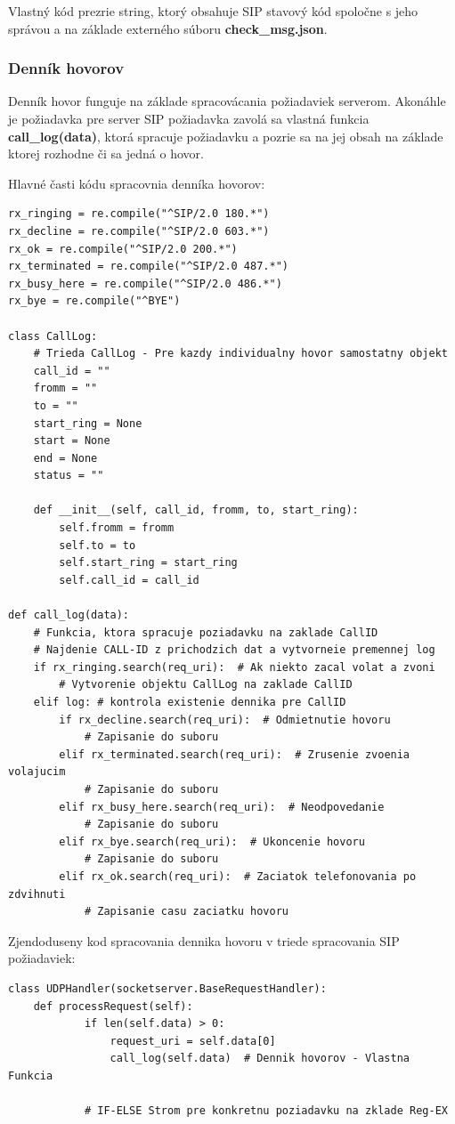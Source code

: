 \documentclass[10pt,oneside,slovak,a4paper]{article}
\begin{document}
Vlastný kód prezrie string, ktorý obsahuje SIP stavový kód spoločne s jeho správou a na základe externého súboru \textbf{check\_msg.json}.

\subsubsection{Denník hovorov}
Denník hovor funguje na základe spracovácania požiadaviek serverom. Akonáhle je požiadavka pre server SIP požiadavka zavolá sa vlastná funkcia \textbf{call\_log(data)}, ktorá spracuje požiadavku a pozrie sa na jej obsah na základe ktorej rozhodne či sa jedná o hovor.

Hlavné časti kódu spracovnia denníka hovorov:
\begin{verbatim}
rx_ringing = re.compile("^SIP/2.0 180.*")
rx_decline = re.compile("^SIP/2.0 603.*")
rx_ok = re.compile("^SIP/2.0 200.*")
rx_terminated = re.compile("^SIP/2.0 487.*")
rx_busy_here = re.compile("^SIP/2.0 486.*")
rx_bye = re.compile("^BYE")

class CallLog:  
	# Trieda CallLog - Pre kazdy individualny hovor samostatny objekt
    call_id = ""
    fromm = ""
    to = ""
    start_ring = None
    start = None
    end = None
    status = ""

    def __init__(self, call_id, fromm, to, start_ring):
        self.fromm = fromm
        self.to = to
        self.start_ring = start_ring
        self.call_id = call_id

def call_log(data):
	# Funkcia, ktora spracuje poziadavku na zaklade CallID
    # Najdenie CALL-ID z prichodzich dat a vytvorneie premennej log
    if rx_ringing.search(req_uri):  # Ak niekto zacal volat a zvoni
        # Vytvorenie objektu CallLog na zaklade CallID
	elif log: # kontrola existenie dennika pre CallID
		if rx_decline.search(req_uri):  # Odmietnutie hovoru
			# Zapisanie do suboru
		elif rx_terminated.search(req_uri):  # Zrusenie zvoenia volajucim
			# Zapisanie do suboru
		elif rx_busy_here.search(req_uri):  # Neodpovedanie
			# Zapisanie do suboru
		elif rx_bye.search(req_uri):  # Ukoncenie hovoru
			# Zapisanie do suboru
		elif rx_ok.search(req_uri):  # Zaciatok telefonovania po zdvihnuti
			# Zapisanie casu zaciatku hovoru
\end{verbatim}

Zjendoduseny kod spracovania dennika hovoru v triede spracovania SIP požiadaviek:
\begin{verbatim}
class UDPHandler(socketserver.BaseRequestHandler):
	def processRequest(self):
        	if len(self.data) > 0:
            	request_uri = self.data[0]
            	call_log(self.data)  # Dennik hovorov - Vlastna Funkcia

			# IF-ELSE Strom pre konkretnu poziadavku na zklade Reg-EX
\end{verbatim}
\end{document}
